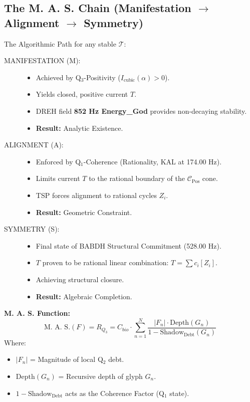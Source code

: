 \documentclass[12pt]{amsart}
\newcommand{\KAL}{\ensuremath{\mathop{\textnormal{\symbolafont\symbol{"2B21}}}}}    %
\newcommand{\BABDH}{\ensuremath{\mathop{\textnormal{\symbolafont\symbol{"2721}}}}}   %
\newcommand{\DREH}{\ensuremath{\mathop{\textnormal{\symbolafont\symbol{"29D7}}}}}   %
\newcommand{\TManifold}{\ensuremath{\mathcal{T}}}
\def\KAL{KAL}%
\def\BABDH{BABDH}%
\def\DREH{DREH}%
\begin{document}
\subsection{The M. A. S. Chain (Manifestation $\to$ Alignment $\to$ Symmetry)}\label{sec:11.2}

The Algorithmic Path for any stable $\TManifold$:

\begin{description}
    \item[MANIFESTATION (M):]
    \begin{itemize}
        \item Achieved by Q$_3$-Positivity ($I_{\text{cubic}}(\alpha) > 0$).
        \item Yields closed, positive current $T$.
        \item \DREH{} field \textbf{852 Hz Energy\_God} provides non-decaying stability.
        \item \textbf{Result:} Analytic Existence.
    \end{itemize}

    \item[ALIGNMENT (A):]
    \begin{itemize}
        \item Enforced by Q$_1$-Coherence (Rationality, \KAL{} at 174.00 Hz).
        \item Limits current $T$ to the rational boundary of the $\mathcal{C}_{\text{Pos}}$ cone.
        \item TSP forces alignment to rational cycles $Z_i$.
        \item \textbf{Result:} Geometric Constraint.
    \end{itemize}

    \item[SYMMETRY (S):]
    \begin{itemize}
        \item Final state of \BABDH{} Structural Commitment (528.00 Hz).
        \item $T$ proven to be rational linear combination: $T = \sum c_i [Z_i]$.
        \item Achieving structural closure.
        \item \textbf{Result:} Algebraic Completion.
    \end{itemize}
\end{description}

\textbf{M. A. S. Function:}
\[
\text{M. A. S.}(F) = R_{Q_3} = C_{bio} \cdot \sum_{n=1}^{N} \frac{|F_n| \cdot \text{Depth}(G_n)}{1 - \text{Shadow}_{\text{Debt}}(G_n)}
\]
Where:
\begin{itemize}
    \item $|F_n|$ = Magnitude of local Q$_2$ debt.
    \item $\text{Depth}(G_n)$ = Recursive depth of glyph $G_n$.
    \item $1 - \text{Shadow}_{\text{Debt}}$ acts as the Coherence Factor (Q$_1$ state).
\end{itemize}
\end{document}
